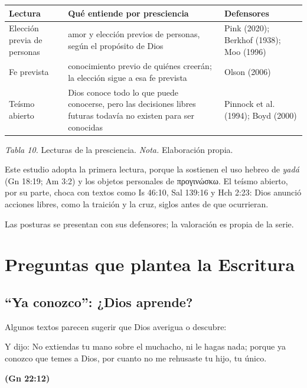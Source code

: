 \documentclass[11pt,letterpaper]{article}
\newcommand{\grc}[1]{\foreignlanguage{ancientgreek}{#1}}
\newcommand{\fuente}[1]{\par\hfill{\upshape\bfseries\small\textcolor{azul}{#1}}}
\begin{document}
\begin{center}\small\renewcommand{\arraystretch}{1.25}
\begin{tabular}{@{}L{2.8cm}L{7.0cm}L{4.6cm}@{}}
\toprule
\textbf{Lectura} & \textbf{Qué entiende por presciencia} & \textbf{Defensores} \\ \midrule
Elección previa de personas & amor y elección previos de personas, según el propósito de Dios & Pink (2020); Berkhof (1938); Moo (1996) \\
Fe prevista & conocimiento previo de quiénes creerán; la elección sigue a esa fe prevista & Olson (2006) \\
Teísmo abierto & Dios conoce todo lo que puede conocerse, pero las decisiones libres futuras todavía no existen para ser conocidas & Pinnock et al. (1994); Boyd (2000) \\
\bottomrule
\end{tabular}\par
{\footnotesize\color{gris}\textit{Tabla 10.} Lecturas de la presciencia. \textit{Nota.} Elaboración propia.}
\end{center}

Este estudio adopta la primera lectura, porque la sostienen el uso hebreo de \emph{yadá} (Gn 18:19; Am 3:2) y los objetos personales de \grc{προγινώσκω}. El teísmo abierto, por su parte, choca con textos como Is 46:10, Sal 139:16 y Hch 2:23: Dios anunció acciones libres, como la traición y la cruz, siglos antes de que ocurrieran.

\begin{nota}[Precisión]
Las posturas se presentan con sus defensores; la valoración es propia de la serie.
\end{nota}

\section{Preguntas que plantea la Escritura}

\subsection{``Ya conozco'': ¿Dios aprende?}
Algunos textos parecen sugerir que Dios averigua o descubre:

\begin{cita}Y dijo: No extiendas tu mano sobre el muchacho, ni le hagas nada; porque ya conozco que temes a Dios, por cuanto no me rehusaste tu hijo, tu único.\fuente{(Gn 22:12)}\end{cita}
\end{document}
